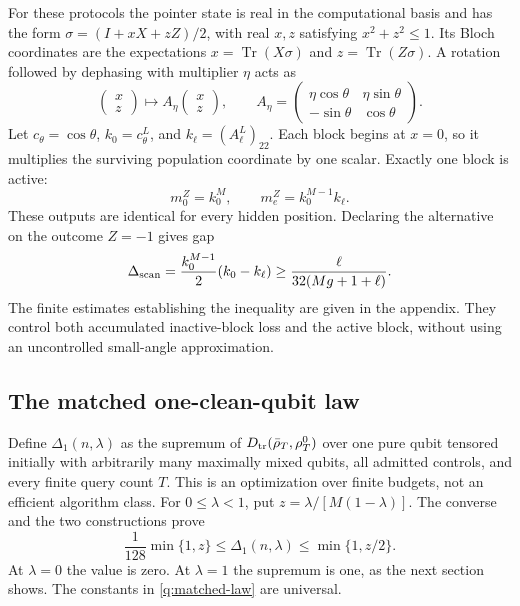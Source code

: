 \documentclass[11pt,a4paper]{article}
\numberwithin{equation}{section}
\theoremstyle{definition}
\theoremstyle{remark}
\DeclareMathOperator{\Tr}{Tr}
\begin{document}
For these protocols the pointer state is real in the computational basis
and has the form $\sigma=(I+xX+zZ)/2$, with real $x,z$ satisfying
$x^2+z^2\leq1$. Its Bloch coordinates are the expectations $x=\Tr(X\sigma)$ and $z=\Tr(Z\sigma)$.
A rotation followed by dephasing with multiplier $\eta$ acts as
\[
 \begin{pmatrix}x\\z\end{pmatrix}
 \longmapsto
 A_\eta\begin{pmatrix}x\\z\end{pmatrix},\qquad
 A_\eta=
 \begin{pmatrix}
 \eta\cos\theta&\eta\sin\theta\\
 -\sin\theta&\cos\theta
 \end{pmatrix}.
\]
Let $c_\theta=\cos\theta$, $k_0=c_\theta^L$, and
$k_\ell=(A_\ell^L)_{22}$. Each block begins at $x=0$, so it multiplies the
surviving population coordinate by one scalar. Exactly one block is active:
\[
 m_0^Z=k_0^M,\qquad m_e^Z=k_0^{M-1}k_\ell .
\]
These outputs are identical for every hidden position. Declaring the
alternative on the outcome $Z=-1$ gives gap
\begin{equation}
 \Delta_{\rm scan}=\frac{k_0^{M-1}}2(k_0-k_\ell)
 \geq\frac{\ell}{32(Mg+1+\ell)}.
 \label{q:scan-gap}
\end{equation}
The finite estimates establishing the inequality are given in the appendix.
They control both accumulated inactive-block loss and the active block, without
using an uncontrolled small-angle approximation.

\subsection{The matched one-clean-qubit law}

Define $\Delta_1(n,\lambda)$ as the supremum of
$D_{\rm tr}(\bar\rho_T,\rho_T^0)$ over one pure qubit tensored initially with
arbitrarily many maximally mixed qubits, all admitted controls, and every finite
query count $T$. This is an optimization over finite budgets, not an efficient
algorithm class. For $0\leq\lambda<1$, put
$z=\lambda/[M(1-\lambda)]$. The converse and the two constructions prove
\begin{equation}
 \boxed{\frac1{128}\min\{1,z\}\leq\Delta_1(n,\lambda)
               \leq\min\{1,z/2\}.}
 \label{q:matched-law}
\end{equation}
At $\lambda=0$ the value is zero. At $\lambda=1$ the supremum is one, as the
next section shows. The constants in \eqref{q:matched-law} are universal.
\end{document}
